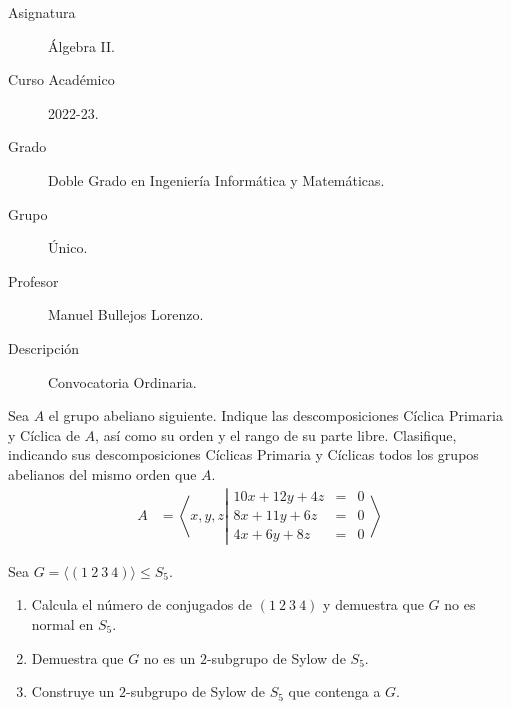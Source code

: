 \documentclass[12pt]{article}
\begin{document}

    
    

    \begin{description}
        \item[Asignatura] Álgebra II.
        \item[Curso Académico] 2022-23.
        \item[Grado] Doble Grado en Ingeniería Informática y Matemáticas.
        \item[Grupo] Único.
        \item[Profesor] Manuel Bullejos Lorenzo.
        \item[Descripción] Convocatoria Ordinaria.
    
    \end{description}
    \newpage


    \begin{ejercicio}
        Sea $A$ el grupo abeliano siguiente. Indique las descomposiciones Cíclica Primaria y Cíclica de $A$, así como su orden y el rango de su parte libre. Clasifique, indicando sus descomposiciones Cíclicas Primaria y Cíclicas todos los grupos abelianos del mismo orden que $A$.
        \begin{align*}
            A & = \left\langle x, y, z\left|\begin{array}{rcl}
                10x + 12y + 4z & = & 0 \\
                8x + 11y + 6z & = & 0 \\
                4x + 6y + 8z & = & 0
            \end{array}\right.\right\rangle
        \end{align*}
    \end{ejercicio}

    \begin{ejercicio}
        Sea $G=\langle (1\ 2\ 3\ 4)\rangle \leq S_5$.
        \begin{enumerate}
            \item Calcula el número de conjugados de $(1\ 2\ 3\ 4)$ y demuestra que $G$ no es normal en $S_5$.
            \item Demuestra que $G$ no es un $2$-subgrupo de Sylow de $S_5$.
            \item Construye un $2$-subgrupo de Sylow de $S_5$ que contenga a $G$.
        \end{enumerate}
    \end{ejercicio}
\end{document}
